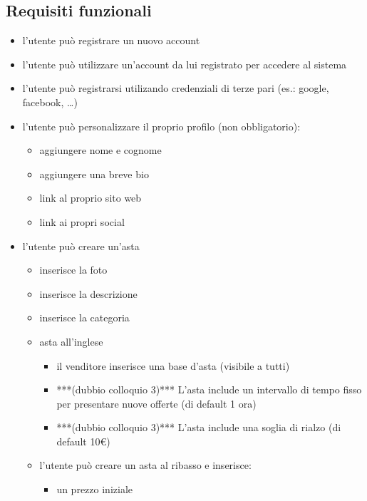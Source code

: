 \subsection{Requisiti funzionali}
\begin{itemize}
	\item l'utente può registrare un nuovo account
	\item l'utente può utilizzare un'account da lui registrato per accedere al sistema
	\item l'utente può registrarsi utilizando credenziali di terze pari (es.: google, facebook, …)
	\item l'utente può personalizzare il proprio profilo (non obbligatorio):
	      \begin{itemize}[label={\tiny$\blacksquare$}]
		      \renewcommand{\labelitemi}{\tiny$\blacksquare$}
		      \item aggiungere nome e cognome
		      \item aggiungere una breve bio
		      \item link al proprio sito web
		      \item link ai propri social
	      \end{itemize}
	      \medskip
	\item l'utente può creare un'asta
	      \begin{itemize}[label={\tiny$\blacksquare$}]
		      \item inserisce la foto
		      \item inserisce la descrizione
		      \item inserisce la categoria
		      \item asta all'inglese
		            \begin{itemize}[label={\tiny$-$}]
			            \item il venditore inserisce una base d'asta (visibile a tutti)
			            \item ***(dubbio colloquio 3)*** L'asta include un intervallo di tempo fisso per presentare nuove offerte (di default 1 ora)
			            \item ***(dubbio colloquio 3)*** L'asta include una soglia di rialzo (di default 10€)
		            \end{itemize}
		      \item l'utente può creare un asta al ribasso e inserisce:
		            \begin{itemize}[label={\tiny$-$}]
			            \item un prezzo iniziale

\end{itemize}
\end{itemize}
\end{itemize}
